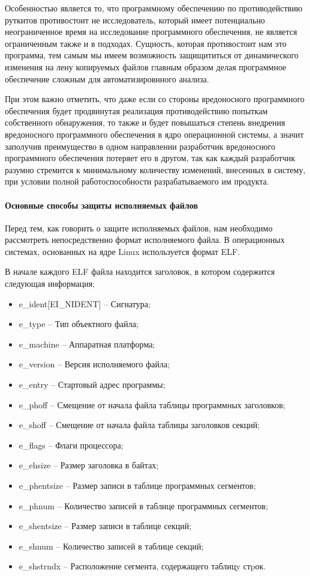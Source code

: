 \documentclass{gost7.32-2001}
\begin{document}
Особенностью является то, что программному обеспечению по
противодействию руткитов противостоит не исследователь, который имеет
потенциально неограниченное время на исследование программного
обеспечения, не является ограниченным также и в подходах. Сущность,
которая противостоит нам это программа, тем самым мы имеем возможность
защищититься от динамического изменения на лену копируемых файлов
главным образом делая программное обеспечение сложным для
автоматизировнного анализа.

При этом важно отметить, что даже если со стороны вредоносного
программного обеспечения будет продвинутая реализация противодействию
попыткам собственного обнаружения, то также и будет повышаться степень
внедрения вредоносного программного обеспечения в ядро операционной
системы, а значит заполучив преимущество в одном направлении
разработчик вредоносного программного обеспечения потеряет его в
другом, так как каждый разработчик разумно стремится к минимальному
количеству изменений, внесенных в систему, при условии полной
работоспособности разрабатываемого им продукта.

\newpage
\paragraph{Основные способы защиты исполняемых файлов}

Перед тем, как говорить о защите исполняемых файлов, нам необходимо
рассмотреть непосредственно формат исполняемого файла. В операционных
системах, основанных на ядре Linux используется формат ELF.

В начале каждого ELF файла находится заголовок, в котором содержится
следующая информация;
\begin{itemize}
\item
  e\_ident[EI\_NIDENT] – Сигнатура;
\item
  e\_type – Тип объектного файла;
\item
  e\_machine – Аппаратная платформа;
\item
  e\_version – Версия исполняемого файла;
\item
  e\_entry – Стартовый адрес программы;
\item
  e\_phoff – Смещение от начала файла таблицы программных заголовков;
\item
  e\_shoff – Смещение от начала файла таблицы заголовков секций;
\item
  e\_flags – Флаги процессора;
\item
  e\_ehsize – Размер заголовка в байтах;
\item
  e\_phentsize – Размер записи в таблице программных сегментов;
\item
  e\_phnum – Количество записей в таблице программных сегментов;
\item
  e\_shentsize – Размер записи в таблице секций;
\item
  e\_shnum – Количество записей в таблице секций;
\item
  e\_shstrndx – Расположение сегмента, содержащего таблицy стpок.
\end{itemize}
\end{document}
